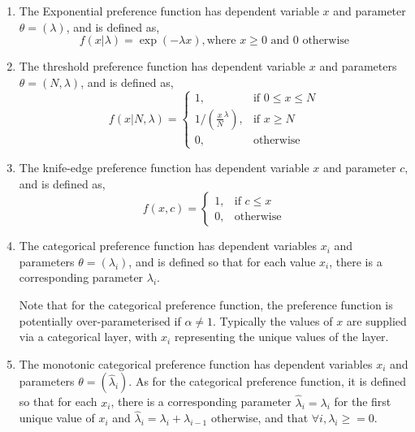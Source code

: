 \begin{enumerate}
\item The Exponential preference function has dependent variable $x$ and parameter $\theta = (\lambda)$, and is defined as,
\begin{equation}
  f(x | \lambda) =\exp(-\lambda x), \text{where $x \geq 0$ and $0$ otherwise}
\end{equation}

\item The threshold preference function has dependent variable $x$ and parameters $\theta = (N,\lambda)$, and is defined as,
\begin{equation}
  f(x | N, \lambda) = \begin{cases}
    1, & \text{if $0 \le x \leq N$} \\
    1/\left({\frac{x}{N}}^\lambda\right), & \text{if $x \ge N$}\\
    0, & \text{otherwise}
  \end{cases}
\end{equation}

\item The knife-edge preference function has dependent variable $x$ and parameter $c$, and is defined as,
\begin{equation}
  f(x, c) = \begin{cases}
    1, & \text{if $c \le x$} \\
    0, & \text{otherwise}
  \end{cases}
\end{equation}

\item The categorical preference function has dependent variables $x_i$ and parameters $\theta = (\lambda_i)$, and is defined so that for each value $x_i$, there is a corresponding parameter $\lambda_i$. 

Note that for the categorical preference function, the preference function is potentially over-parameterised if $\alpha \ne 1$. Typically the values of $x$ are supplied via a categorical layer, with $x_i$ representing the unique values of the layer.

\item The monotonic categorical preference function has dependent variables $x_i$ and parameters $\theta = (\hat{\lambda}_i)$. As for the categorical preference function, it is defined so that for each $x_i$, there is a corresponding parameter $\hat{\lambda}_i = \lambda_i$ for the first unique value of $x_i$ and  $\hat{\lambda}_i = \lambda_i+ \lambda_{i-1}$ otherwise, and that $\forall{i}, \lambda_i \ge=0 $.


\end{enumerate}

